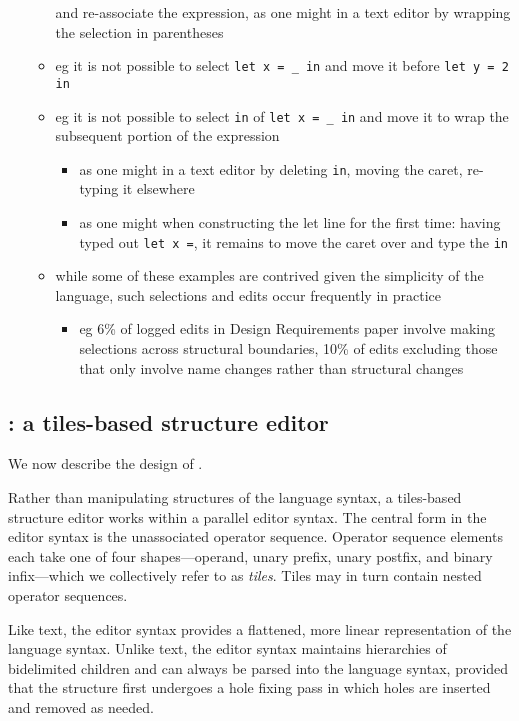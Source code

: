 \begin{itemize}
\begin{itemize}
      and re-associate the expression, as one might in a text editor by
      wrapping the selection in parentheses
    \item eg it is not possible to select \texttt{let x = \_ in} and
      move it before \texttt{let y = 2 in}
    \item eg it is not possible to select \texttt{in} of \texttt{let x = \_ in}
      and move it to wrap the subsequent portion of the expression
    \begin{itemize}
      \item as one might in a text editor by deleting \texttt{in},
        moving the caret, re-typing it elsewhere
      \item as one might when constructing the let line for the first time:
        having typed out \texttt{let x =}, it remains to move the caret over
        and type the \texttt{in}
    \end{itemize}
    \item while some of these examples are contrived given the simplicity of
      the language, such selections and edits occur frequently in practice
    \begin{itemize}
      \item eg 6\% of logged edits in Design Requirements
        paper involve making
        selections across structural boundaries, 10\% of edits excluding those
        that only involve name changes rather than structural changes
    \end{itemize}
  \end{itemize}
\end{itemize}

\subsection{\tylr: a tiles-based structure editor}

We now describe the design of \tylr. 

Rather than manipulating structures of the language syntax,
a tiles-based structure editor works within a parallel editor syntax.
The central form in the editor syntax is the unassociated operator
sequence. Operator sequence elements each take one of four shapes---operand,
unary prefix, unary postfix, and
binary infix---which we collectively refer to as \emph{tiles}.
Tiles may in turn contain nested operator sequences.

Like text, the editor syntax provides a flattened, more linear representation
of the language syntax.
Unlike text, the editor syntax maintains hierarchies of
bidelimited children and can always be parsed into the
language syntax, provided that the structure first undergoes
a hole fixing pass in which holes are inserted and removed
as needed.

